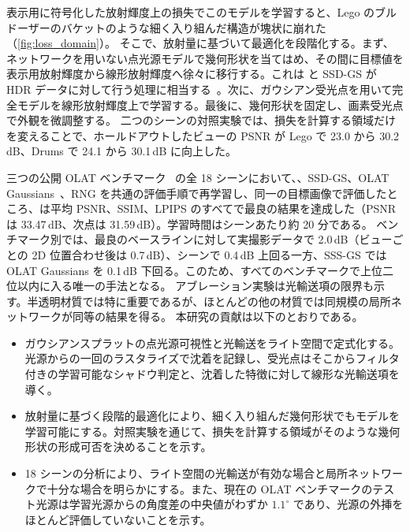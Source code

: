 表示用に符号化した放射輝度上の損失でこのモデルを学習すると、Lego のブルドーザーのバケットのような細く入り組んだ構造が塊状に崩れた（\cref{fig:loss_domain}）。
そこで、放射量に基づいて最適化を段階化する。まず、ネットワークを用いない点光源モデルで幾何形状を当てはめ、その間に目標値を表示用放射輝度から線形放射輝度へ徐々に移行する。これは \gsthree と SSD-GS が HDR データに対して行う処理に相当する~\cite{bi2024gs3,zheng2026ssdgs}。次に、ガウシアン受光点を用いて完全モデルを線形放射輝度上で学習する。最後に、幾何形状を固定し、画素受光点で外観を微調整する。
二つのシーンの対照実験では、損失を計算する領域だけを変えることで、ホールドアウトしたビューの PSNR が Lego で 23.0 から 30.2\,dB、Drums で 24.1 から 30.1\,dB に向上した。

三つの公開 OLAT ベンチマーク~\cite{zeng2023nrhints,bi2024gs3,dihlmann2024sss} の全 18 シーンにおいて、\gsthree、SSD-GS、OLAT Gaussians~\cite{kuang2024olat}、RNG を共通の評価手順で再学習し、同一の目標画像で評価したところ、\ours は平均 PSNR、SSIM、LPIPS のすべてで最良の結果を達成した（PSNR は 33.47\,dB、次点は 31.59\,dB）。学習時間はシーンあたり約 20 分である。
ベンチマーク別では、最良のベースラインに対して実撮影データで 2.0\,dB（ビューごとの 2D 位置合わせ後は 0.7\,dB）、\gsthree シーンで 0.4\,dB 上回る一方、SSS-GS では OLAT Gaussians を 0.1\,dB 下回る。このため、すべてのベンチマークで上位二位以内に入る唯一の手法となる。
アブレーション実験は光輸送項の限界も示す。半透明材質では特に重要であるが、ほとんどの他の材質では同規模の局所ネットワークが同等の結果を得る。
本研究の貢献は以下のとおりである。
\begin{itemize}
\item ガウシアンスプラットの点光源可視性と光輸送をライト空間で定式化する。光源からの一回のラスタライズで沈着を記録し、受光点はそこからフィルタ付きの学習可能なシャドウ判定と、沈着した特徴に対して線形な光輸送項を導く。
\item 放射量に基づく段階的最適化により、細く入り組んだ幾何形状でもモデルを学習可能にする。対照実験を通じて、損失を計算する領域がそのような幾何形状の形成可否を決めることを示す。
\item 18 シーンの分析により、ライト空間の光輸送が有効な場合と局所ネットワークで十分な場合を明らかにする。また、現在の OLAT ベンチマークのテスト光源は学習光源からの角度差の中央値がわずか $1.1^\circ$ であり、光源の外挿をほとんど評価していないことを示す。
\end{itemize}
